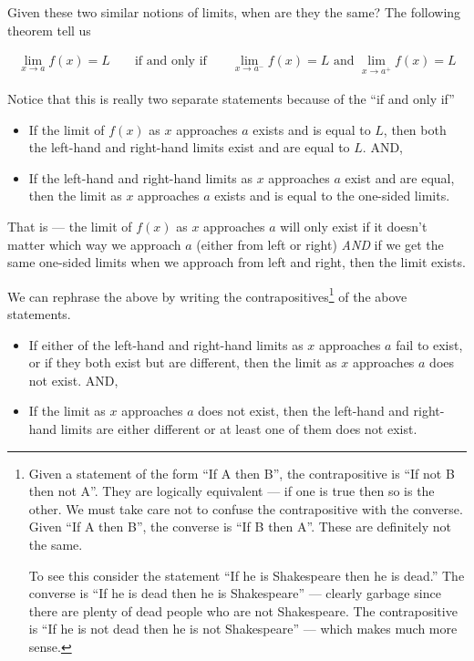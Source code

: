 Given these two similar notions of limits, when are they the same? The
following theorem tell us
\begin{theorem}\label{thm_1_3_1}
\begin{align*}
  \lim_{x \to a} f(x) = L && \mbox{ if and only if }
  && \lim_{x \to a^-} f(x) = L  \mbox{ and }
  \lim_{x \to a^+} f(x) = L
\end{align*}
\end{theorem}
Notice that this is really two separate statements because of the ``if and only
if''
\begin{itemize}
 \item If the limit of $f(x)$ as $x$ approaches $a$ exists and is equal to $L$,
then both the left-hand and right-hand limits exist and are equal to $L$. AND,
 \item If the left-hand and right-hand limits as $x$ approaches $a$ exist and
are equal, then the limit as $x$ approaches $a$ exists and is equal to the
one-sided limits.
\end{itemize}
That is --- the limit of $f(x)$ as $x$ approaches $a$ will only exist if it
doesn't matter which way we approach $a$ (either from left or right)
\emph{AND}
if we get the same one-sided limits when we approach from left and right, then
the limit exists.



We can rephrase the above by writing the contrapositives\footnote{\label{footnote contrapositive}Given a
statement of the form ``If A then B'', the contrapositive is ``If not B then
not A''. They are logically equivalent --- if one is true then so is the
other. We must take care not to confuse the contrapositive with the converse.
Given ``If A then B'', the converse is ``If B then A''. These are definitely not
the same.

To see this consider the statement ``If he is Shakespeare then he is dead.''
The converse is ``If he is dead then he is Shakespeare'' --- clearly garbage
since there are plenty of dead people who are not Shakespeare. The
contrapositive is ``If he is not dead then he is not Shakespeare'' --- which
makes much more sense.} of the above statements.
\begin{itemize}
\item If either of the left-hand and right-hand limits as $x$ approaches $a$
fail to exist, or if they both exist but are different, then the limit as $x$
approaches $a$ does not exist. AND,
 \item If the limit as $x$ approaches $a$ does not exist, then the left-hand
and right-hand limits are either different or at least one of them does not
exist.
\end{itemize}


